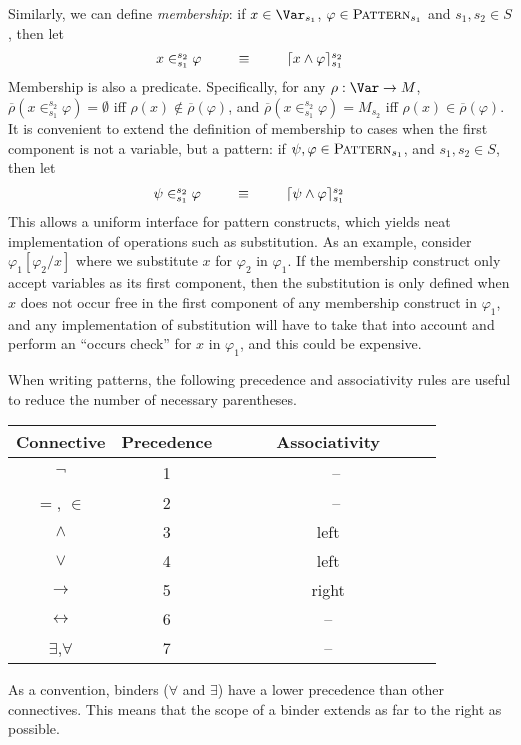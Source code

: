 \documentclass[UTF8,11pt]{article}
\theoremstyle{plain}
\theoremstyle{definition}
\theoremstyle{remark}
\newcommand{\Pattern}{\textsc{Pattern}\xspace}
\newcommand{\ra}{\rightarrow}
\begin{document}
Similarly, we can define \emph{membership}:
if $x\in\Var_{s_1}$, $\varphi\in\Pattern_{s_1}$ and $s_1,s_2\in S$, then
let
$$
\begin{array}{@{}rcll}
x \in_{s_1}^{s_2} \varphi & \ \ \ \ \ \equiv \ \ \ \ \ &
\lceil x \wedge \varphi\rceil_{s_1}^{s_2}
& %
\end{array}
$$
Membership is also a predicate.
Specifically, for any $\rho:\Var\ra M$,
$\overline{\rho}(x \in_{s_1}^{s_2} \varphi) = \emptyset$
iff $\rho(x) \not\in \overline{\rho}(\varphi)$, and
$\overline{\rho}(x \in_{s_1}^{s_2} \varphi) = M_{s_2}$
iff $\rho(x) \in \overline{\rho}(\varphi)$.
It is convenient to extend the definition of membership to cases when the first 
component is not a variable, but a pattern:
if $\psi, \varphi \in \Pattern_{s_1}$, and $s_1,s_2\in S$, 
then let
$$
\begin{array}{@{}rcll}
\psi \in_{s_1}^{s_2} \varphi & \ \ \ \ \ \equiv \ \ \ \ \ &
\lceil \psi \wedge \varphi\rceil_{s_1}^{s_2}
& %
\end{array}
$$
This allows a uniform interface for pattern constructs, which yields neat 
implementation of operations such as substitution.
As an example, consider $\varphi_1[\varphi_2 / x]$ where we 
substitute $x$ for $\varphi_2$ in $\varphi_1$.
If the membership construct only accept variables as its first component, then 
the substitution is only defined when $x$ does not occur free in the first 
component of any membership construct in $\varphi_1$, and any implementation of 
substitution will have to take that into account and perform an 
``occurs check'' for $x$ in $\varphi_1$, and this could be expensive.

When writing patterns, the following precedence and associativity rules are 
useful to reduce the 
number of necessary parentheses.
\begin{center}
	\begin{tabular}{c|c|c}
		Connective      &     Precedence & Associativity \\\hline
		$\neg$          &     1          & 　--　　　　　　　　　　　\\\hline
		$=$, $\in$      &     2          & 　--          　\\\hline
		$\wedge$        &     3          &  left         \\\hline
		$\vee$          &     4          &  left         \\\hline
		$\to$           &     5          &  right        \\\hline
		$\leftrightarrow$ &   6          &  --           \\\hline
		$\exists$,$\forall$ & 7          &  --           \\\hline
	\end{tabular}
\end{center}
As a convention, binders ($\forall$ and $\exists$) have a lower precedence than 
other connectives.
This means that the scope of a binder extends as far to the right as possible. 
\end{document}

